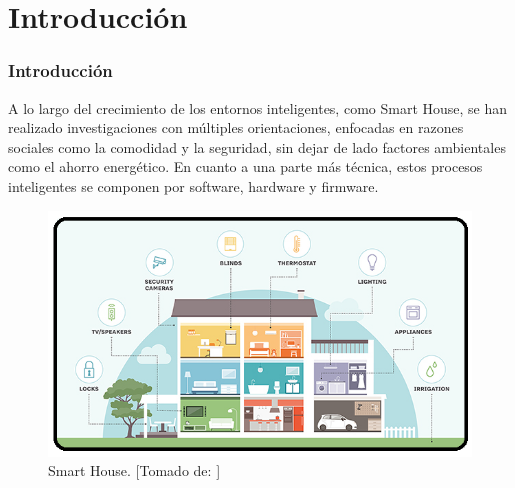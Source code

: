 \section{Introducción}
\begin{frame}
\frametitle{Introducción}
\footnotesize
 A lo largo del crecimiento de los entornos inteligentes, como Smart House, se han realizado investigaciones con múltiples orientaciones, enfocadas en razones sociales como la comodidad y la seguridad, sin dejar de lado factores ambientales como el ahorro energético. En cuanto a una parte más técnica, estos procesos inteligentes se componen por software, hardware y firmware.
 
 \begin{figure}[!]
 	\centering
 	\caption{Smart House. [Tomado de: \cite{SHi}]}
 	\label{fig:intr}
 	\includegraphics[width=0.6\linewidth]{Imagenes/intro}
 \end{figure}
\end{frame}